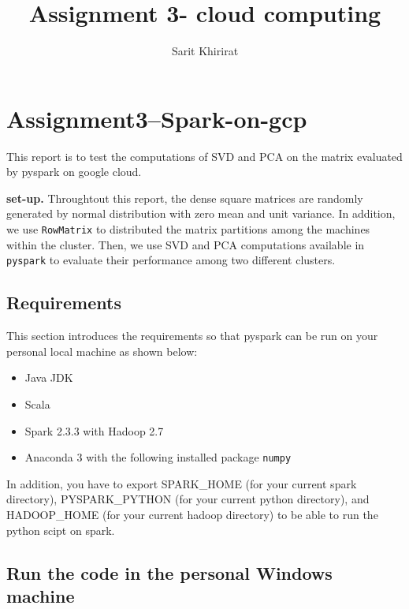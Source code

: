\documentclass[]{article}
\title{Assignment 3- cloud computing}
\author{Sarit Khirirat}
\providecommand{\tightlist}{%
  \setlength{\itemsep}{0pt}\setlength{\parskip}{0pt}}
\begin{document}
\maketitle

\hypertarget{assignment3spark-on-gcp}{%
\section{Assignment3--Spark-on-gcp}\label{assignment3spark-on-gcp}}

This report is to test the computations of SVD and PCA on the matrix
evaluated by pyspark on google cloud.

\textbf{set-up.} Throughtout this report, the dense square matrices are
randomly generated by normal distribution with zero mean and unit
variance. In addition, we use \texttt{RowMatrix} to distributed the
matrix partitions among the machines within the cluster. Then, we use
SVD and PCA computations available in \texttt{pyspark} to evaluate their
performance among two different clusters.

\hypertarget{requirements}{%
\subsection{Requirements}\label{requirements}}

This section introduces the requirements so that pyspark can be run on
your personal local machine as shown below:

\begin{itemize}
\tightlist
\item
  Java JDK
\item
  Scala
\item
  Spark 2.3.3 with Hadoop 2.7
\item
  Anaconda 3 with the following installed package \texttt{numpy}
\end{itemize}

In addition, you have to export SPARK\_HOME (for your current spark
directory), PYSPARK\_PYTHON (for your current python directory), and
HADOOP\_HOME (for your current hadoop directory) to be able to run the
python scipt on spark.

\hypertarget{run-the-code-in-the-personal-windows-machine}{%
\subsection{Run the code in the personal Windows
machine}\label{run-the-code-in-the-personal-windows-machine}}
\end{document}
